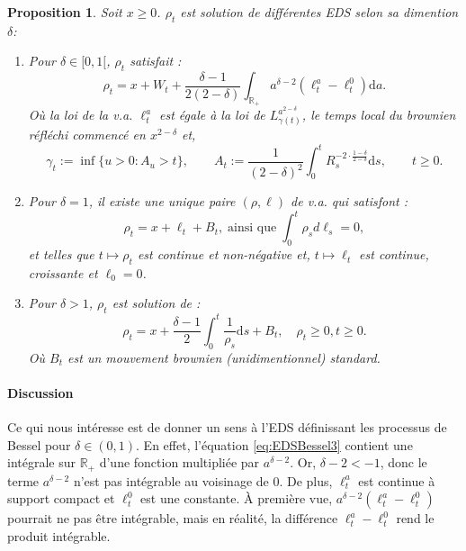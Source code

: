 \documentclass[openany]{book}
\newcommand{\R}{\mathbb{R}}
\newcommand{\1}{\mathbbm{1}}
\renewcommand{\d}{\mathrm{d}}
\theoremstyle{thmfont}
\theoremstyle{deffont}
\theoremstyle{thmfont}
\newtheorem{prop}[prop]{Proposition}
\theoremstyle{deffont}
\begin{document}
\begin{prop}
  \label{prop:EDSBessel}
  Soit $x \geq 0$. $\rho_t$ est solution de différentes EDS selon sa dimention $\delta$:
  \begin{enumerate}
    \item Pour $\delta \in [0,1[$, $\rho_t$ satisfait :
     \begin{equation}
       \rho_t = x + W_t + \dfrac{\delta-1}{2(2-\delta)}\int_{\R_+} a^{\delta -2}(\ell_t^a- \ell_t^0)\d a .
       \label{eq:EDSBessel3}
     \end{equation}
     \noindent Où la loi de la v.a. $\ell_t^a$ est égale à la loi de $L_{\gamma(t)}^{a^{2-\delta}}$, le temps local du brownien réfléchi commencé en $x^{2-\delta}$ et,
     $$\gamma_t := \inf\{u > 0 : A_u > t\}, \qquad
     A_t := \frac{1}{(2 - \delta)^2} \int_0^t R_s^{-2 \cdot \frac{1 - \delta}{2 - \delta}} \d s, \qquad t \geq 0.$$
   \item Pour $\delta =1$, il existe une unique paire $(\rho, \ell)$ de v.a. qui satisfont :
     \begin{equation}
       \rho_t = x + \ell_t + B_t, \;\text{ainsi que}\; \int_0^t \rho_s d\ell_s = 0,
       \label{eq:EDSBessel2}
     \end{equation}
     \noindent et telles que $t\mapsto \rho_t$ est continue et non-négative et, $t \mapsto \ell_t$ est continue, croissante et $\ell_0 = 0$.\\
   \item Pour $\delta > 1$, $\rho_t$ est solution de :
     \begin{equation}
       \rho_t = x + \dfrac{\delta-1}{2}\int_0^t \dfrac{1}{\rho_s} \d s + B_t, \quad \rho_t \geq 0, t \geq 0.
       \label{eq:EDSBessel1}
     \end{equation}
     \noindent Où $B_t$ est un mouvement brownien (unidimentionnel) standard.
 \end{enumerate}

\end{prop}

\paragraph{Discussion}
Ce qui nous intéresse est de donner un sens à l’EDS définissant les processus de Bessel pour $\delta \in (0,1)$. En effet, l’équation \eqref{eq:EDSBessel3} contient une intégrale sur $\mathbb{R}_+$ d’une fonction multipliée par $a^{\delta-2}$. Or, $\delta-2 < -1$, donc le terme $a^{\delta-2}$ n’est pas intégrable au voisinage de 0. De plus, $\ell_t^a$ est continue à support compact et $\ell_t^0$ est une constante. À première vue, $a^{\delta-2}(\ell_t^a - \ell_t^0)$ pourrait ne pas être intégrable, mais en réalité, la différence $\ell_t^a - \ell_t^0$ rend le produit intégrable.
\end{document}
